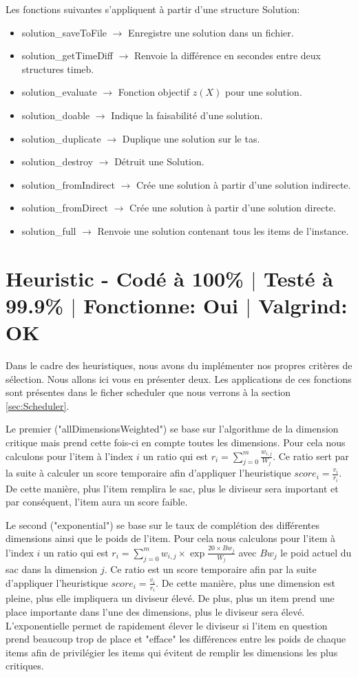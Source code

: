 \documentclass{EPUProjetPeiP}
\newcommand{\comp}[5]{
	\section[#1]{#1 {\small - Codé à #2\% $\vert$ Testé à #3\% $\vert$ Fonctionne: #4 $\vert$ Valgrind: #5}}
}
\begin{document}
Les fonctions suivantes s'appliquent à partir d'une structure Solution:
\begin{itemize}
	\item solution\_saveToFile $\longrightarrow$ Enregistre une solution dans un fichier.
	\item solution\_getTimeDiff $\longrightarrow$ Renvoie la différence en secondes entre deux structures timeb.
	\item solution\_evaluate $\longrightarrow$ Fonction objectif $z(X)$ pour une solution.
	\item solution\_doable $\longrightarrow$ Indique la faisabilité d'une solution.
	\item solution\_duplicate $\longrightarrow$ Duplique une solution sur le tas.
	\item solution\_destroy $\longrightarrow$ Détruit une Solution.
	\item solution\_fromIndirect $\longrightarrow$ Crée une solution à partir d'une solution indirecte.
	\item solution\_fromDirect $\longrightarrow$ Crée une solution à partir d'une solution directe.
	\item solution\_full $\longrightarrow$ Renvoie une solution contenant tous les items de l'instance.
\end{itemize}

\comp{Heuristic \label{sec:Heuristic}}{100}{99.9}{Oui}{OK}
Dans le cadre des heuristiques, nous avons du implémenter nos propres critères de sélection. Nous allons ici vous en présenter deux. Les applications de ces fonctions sont présentes dans le ficher scheduler que nous verrons à la section \ref{sec:Scheduler}.

Le premier ("allDimensionsWeighted") se base sur l'algorithme de la dimension critique mais prend cette fois-ci en compte toutes les dimensions. Pour cela nous calculons pour l'item à l'index $i$ un ratio qui est $r_i=\sum_{j=0}^m\frac{w_{i,j}}{W_j}$. Ce ratio sert par la suite à calculer un score temporaire afin d'appliquer l'heuristique $score_i=\frac{v_i}{r_i}$. De cette manière, plus l'item remplira le sac, plus le diviseur sera important et par conséquent, l'item aura un score faible.

Le second ("exponential") se base sur le taux de complétion des différentes dimensions ainsi que le poids de l'item. Pour cela nous calculons pour l'item à l'index $i$ un ratio qui est $r_i=\sum_{j=0}^mw_{i,j}\times\exp{\frac{20\times Bw_j}{W_j}}$ avec $Bw_j$ le poid actuel du sac dans la dimension $j$. Ce ratio est un score temporaire afin par la suite d'appliquer l'heuristique $score_i=\frac{v_i}{r_i}$. De cette manière, plus une dimension est pleine, plus elle impliquera un diviseur élevé. De plus, plus un item prend une place importante dans l'une des dimensions, plus le diviseur sera élevé. L'exponentielle permet de rapidement élever le diviseur si l'item en question prend beaucoup trop de place et "efface" les différences entre les poids de chaque items afin de privilégier les items qui évitent de remplir les dimensions les plus critiques.
\end{document}
